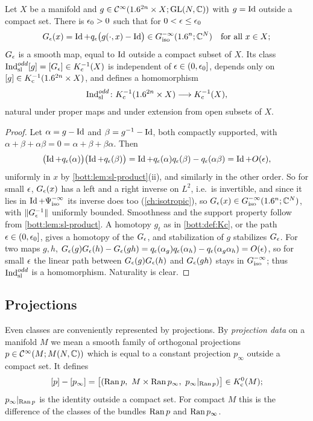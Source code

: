 \begin{proposition}\label{bott:prop:odd-sl}
  Let $X$ be a manifold and $g\in\mathcal{C}^\infty(1.6^{2n}\times X;\operatorname{GL}(N,\mathbb{C}))$ with $g=\operatorname{Id}$ outside a
  compact set. There is $\epsilon_0>0$ such that for $0<\epsilon\le\epsilon_0$
  \begin{equation*}
    G_\epsilon(x)=\operatorname{Id}+q_\epsilon\bigl(g(\cdot,x)-\operatorname{Id}\bigr)\in G^{-\infty}_{\mathrm{iso}}(1.6^n;\mathbb{C}^N)\quad\text{for all }x\in X;
  \end{equation*}
  $G_\epsilon$ is a smooth map, equal to $\operatorname{Id}$ outside a compact subset of $X$. Its class
  $\operatorname{Ind}^{odd}_{\mathrm{sl}}[g]=[G_\epsilon]\in K_{\mathrm{c}}^{-1}(X)$ is independent of $\epsilon\in(0,\epsilon_0]$, depends only
  on $[g]\in K_{\mathrm{c}}^{-1}(1.6^{2n}\times X)$, and defines a homomorphism
  \begin{equation*}
    \operatorname{Ind}^{odd}_{\mathrm{sl}}\colon K_{\mathrm{c}}^{-1}(1.6^{2n}\times X)\longrightarrow K_{\mathrm{c}}^{-1}(X),
  \end{equation*}
  natural under proper maps and under extension from open subsets of $X$.
\end{proposition}
\begin{proof}
  Let $\alpha=g-\operatorname{Id}$ and $\beta=g^{-1}-\operatorname{Id}$, both compactly supported, with
  $\alpha+\beta+\alpha\beta=0=\alpha+\beta+\beta\alpha$. Then
  \begin{equation*}
    \bigl(\operatorname{Id}+q_\epsilon(\alpha)\bigr)\bigl(\operatorname{Id}+q_\epsilon(\beta)\bigr)
    =\operatorname{Id}+q_\epsilon(\alpha)q_\epsilon(\beta)-q_\epsilon(\alpha\beta)=\operatorname{Id}+O(\epsilon),
  \end{equation*}
  uniformly in $x$ by \cref{bott:lem:sl-product}(ii), and similarly in the other order. So
  for small $\epsilon$, $G_\epsilon(x)$ has a left and a right inverse on $L^2$, i.e.\ is invertible,
  and since it lies in $\operatorname{Id}+\Psi^{-\infty}_{\mathrm{iso}}$ its inverse does too (\cref{ch:isotropic}), so
  $G_\epsilon(x)\in G^{-\infty}_{\mathrm{iso}}(1.6^n;\mathbb{C}^N)$, with $\lVert G_\epsilon^{-1}\rVert$ uniformly bounded. Smoothness
  and the support property follow from \cref{bott:lem:sl-product}. A homotopy $g_t$ as in
  \cref{bott:def:Kc}, or the path $\epsilon\in(0,\epsilon_0]$, gives a homotopy of the $G_\epsilon$, and
  stabilization of $g$ stabilizes $G_\epsilon$. For two maps $g,h$,
  $G_\epsilon(g)G_\epsilon(h)-G_\epsilon(gh)=q_\epsilon(\alpha_g)q_\epsilon(\alpha_h)-q_\epsilon(\alpha_g\alpha_h)=O(\epsilon)$,
  so for small $\epsilon$ the linear path between $G_\epsilon(g)G_\epsilon(h)$ and $G_\epsilon(gh)$ stays in
  $G^{-\infty}_{\mathrm{iso}}$; thus $\operatorname{Ind}^{odd}_{\mathrm{sl}}$ is a homomorphism. Naturality is clear.
\end{proof}

\subsection{Projections}
Even classes are conveniently represented by projections. By \emph{projection data} on
a manifold $M$ we mean a smooth family of orthogonal projections
$p\in\mathcal{C}^\infty(M;M(N,\mathbb{C}))$ which is equal to a constant projection $p_\infty$ outside a
compact set. It defines
\begin{equation}\label{bott:eq:proj-class}
  [p]-[p_\infty]=\bigl[(\operatorname{Ran} p,\ M\times\operatorname{Ran} p_\infty,\ p_\infty|_{\operatorname{Ran} p})\bigr]\in K_{\mathrm{c}}^0(M);
\end{equation}
$p_\infty|_{\operatorname{Ran} p}$ is the identity outside a compact set. For compact $M$ this is the
difference of the classes of the bundles $\operatorname{Ran} p$ and $\operatorname{Ran} p_\infty$.

